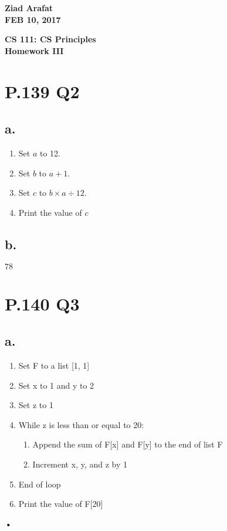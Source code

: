 \documentclass{article}%
\begin{document}
\begin{flushright}
\textbf{Ziad Arafat \\
FEB 10, 2017}
\end{flushright}

\begin{center}
\textbf{CS 111: CS Principles \\
Homework III} \\
\end{center}

\section*{P.139 Q2}
\subsection*{a.}
\begin{enumerate}
\item Set $a$ to 12.
\item Set $b$ to $a+1$.
\item Set $c$ to $b \times a \div 12$.
\item Print the value of $c$
\end{enumerate}

\subsection*{b.}
$78$

\section*{P.140 Q3}

\subsection*{a.}
\begin{enumerate}
\item Set F to a list [1, 1]
\item Set x to 1 and y to 2
\item Set z to 1
\item While z is less than or equal to 20:
\begin{enumerate}
\item Append the sum of F[x] and F[y] to the end of list F
\item Increment x, y, and z by 1
\end{enumerate}
\item End of loop
\item Print the value of F[20]
\end{enumerate}\textbf{•}
\end{document}
